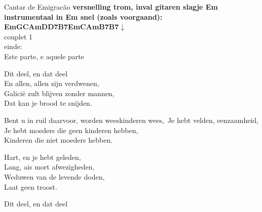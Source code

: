 \begin{song}[fado]{Cantar de Emigracão}
\textbf{versnelling trom, inval gitaren slagje Em}\\
\textbf{instrumentaal in Em snel (zoals voorgaand):\\Em\phantom{xxx}G\phantom{xxx}C\phantom{xi}Am\phantom{xi}D\phantom{xxx}D7\phantom{xi}B7\phantom{xi}Em\phantom{xxx}C\phantom{xi}Am\phantom{xi}B7\phantom{xi}B7$\downarrow$}\\
	couplet 1\\
	einde:\\
	Este parte, e aquele parte
\end{song}

\clearpage
\begin{translation}
Dit deel, en dat deel\\
En allen, allen zijn verdwenen,\\
Galicië zult blijven zonder mannen,\\
Dat kan je brood te snijden.\vspace{\wlskip}

Bent u in ruil daarvoor, worden weeskinderen wees,\
Je hebt velden, eenzaamheid,\\
Je hebt moeders die geen kinderen hebben,\\
Kinderen die niet moeders hebben.\vspace{\wlskip}

Hart, en je hebt geleden,\\
Lang, ais mort afwezigheden,\\
Weduwen van de levende doden,\\
Laat geen troost.\vspace{\wlskip}

Dit deel, en dat deel
\end{translation}
